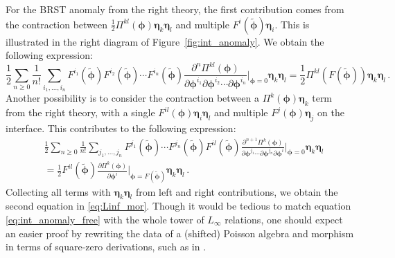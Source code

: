 \documentclass[11pt]{article}
\numberwithin{equation}{section}
\begin{document}
For the BRST anomaly from the right theory, the first contribution comes from the contraction between $\frac{1}{2}\Pi^{kl}(\boldsymbol{\phi})\boldsymbol{\eta}_k\boldsymbol{\eta}_l$ and multiple $F^i(\widetilde{\boldsymbol{\phi}})\boldsymbol{\eta}_i$. This is illustrated in the right diagram of Figure~\ref{fig:int_anomaly}. We obtain the following expression:
\begin{equation}
	\frac{1}{2}\sum_{n \geq 0}\frac{1}{n!}\sum_{i_1,\dots,i_n}F^{i_1}(\widetilde{\boldsymbol{\phi}}) F^{i_2}(\widetilde{\boldsymbol{\phi}}) \cdots F^{i_n}(\widetilde{\boldsymbol{\phi}})\frac{\partial^n \Pi^{kl}(\boldsymbol{\phi})}{\partial \boldsymbol{\phi}^{i_1}\partial \boldsymbol{\phi}^{i_2}\cdots \partial \boldsymbol{\phi}^{i_n}}\Big|_{\boldsymbol{\phi} = 0}\boldsymbol{\eta}_k\boldsymbol{\eta}_l = \frac{1}{2}\Pi^{kl}(F(\widetilde{\boldsymbol{\phi}}))\boldsymbol{\eta}_k\boldsymbol{\eta}_l\,.
\end{equation}
Another possibility is to consider the contraction between a $\Pi^{k}(\boldsymbol{\phi})\boldsymbol{\eta}_k$ term from the right theory, with a single $F^{il}(\boldsymbol{\phi})\boldsymbol{\eta}_i\boldsymbol{\eta}_l$ and multiple $F^{j}(\boldsymbol{\phi})\boldsymbol{\eta}_j$ on the interface. This contributes to the following expression:
\begin{equation}
\begin{aligned}
		&\frac{1}{2}\sum_{n \geq 0}\frac{1}{n!}\sum_{j_1,\dots,j_n}F^{j_1}(\widetilde{\boldsymbol{\phi}}) \cdots F^{j_n}(\widetilde{\boldsymbol{\phi}})F^{il}(\widetilde{\boldsymbol{\phi}})\frac{\partial^{n+1} \Pi^{k}(\boldsymbol{\phi})}{\partial \boldsymbol{\phi}^{j_1}\cdots \partial \boldsymbol{\phi}^{j_n}\partial \boldsymbol{\phi}^{i}}\Big|_{\boldsymbol{\phi} = 0}\boldsymbol{\eta}_k\boldsymbol{\eta}_l\\
		& = \frac{1}{2}F^{il}(\widetilde{\boldsymbol{\phi}})\frac{\partial \Pi^{k}(\boldsymbol{\phi})}{\partial \boldsymbol{\phi}^{i}}\Big|_{\boldsymbol{\phi} = F(\widetilde{\boldsymbol{\phi}})}\boldsymbol{\eta}_k\boldsymbol{\eta}_l\,.
\end{aligned}
\end{equation}
Collecting all terms with $\boldsymbol{\eta}_k\boldsymbol{\eta}_l$ from left and right contributions, we obtain the second equation in \eqref{eq:Linf_mor}. Though it would be tedious to match equation \eqref{eq:int_anomaly_free} with the whole tower of $L_\infty$ relations, one should expect an easier proof by rewriting the data of a (shifted) Poisson algebra and morphism in terms of square-zero derivations, such as in \cite{bandiera2020shifted}.
\end{document}
